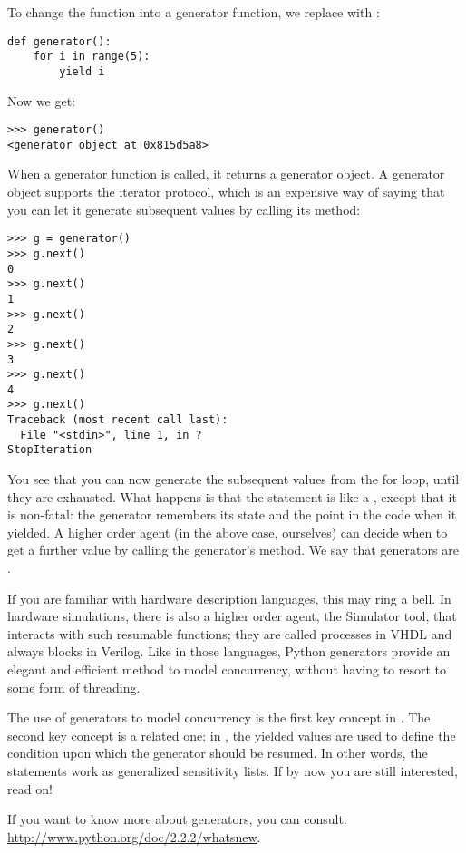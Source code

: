 To change the function into a generator function, we replace
 with :

\begin{verbatim}
def generator():
    for i in range(5):
        yield i

\end{verbatim}

Now we get:

\begin{verbatim}
>>> generator()
<generator object at 0x815d5a8>

\end{verbatim}

When a generator function is called, it returns a generator object. A
generator object supports the iterator protocol, which is an expensive
way of saying that you can let it generate subsequent values by
calling its  method:

\begin{verbatim}
>>> g = generator()
>>> g.next()
0
>>> g.next()
1
>>> g.next()
2
>>> g.next()
3
>>> g.next()
4
>>> g.next()
Traceback (most recent call last):
  File "<stdin>", line 1, in ?
StopIteration

\end{verbatim}

You see that you can now generate the subsequent values from the for
loop, until they are exhausted. What happens is that the
 statement is like a
, except that it is non-fatal: the generator remembers
its state and the point in the code when it yielded. A higher order
agent (in the above case, ourselves) can decide when to get a further
value by calling the generator's 
method. We say that generators are .

If you are familiar with hardware description languages, this may
ring a bell. In hardware simulations, there is also a higher order
agent, the Simulator tool, that interacts with such resumable
functions; they are called processes in VHDL and always blocks in
Verilog. Like in those languages, Python generators provide an elegant
and efficient method to model concurrency, without having to resort to
some form of threading.

The use of generators to model concurrency is the first key concept in
\myhdl{}. The second key concept is a related one: in \myhdl{}, the
yielded values are used to define the condition upon which the generator
should be resumed. In other words, the  statements work
as generalized sensitivity lists. If by now you are still interested,
read on!

If you want to know more about generators, you can consult.
\url{http://www.python.org/doc/2.2.2/whatsnew}. 

